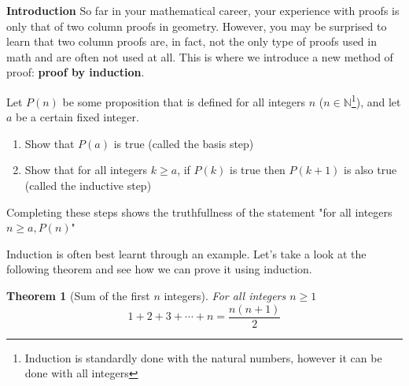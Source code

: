 \documentclass[addpoints]{exam}
\newtheorem{theorem}{Theorem}
\begin{document}
\begin{tcolorbox}[breakable, title=INDUCTION INTRO, colframe=black, sharp corners, colback=white, colbacktitle=white, coltitle=black]
	\Large\textbf{Introduction}
	\newline\normalsize So far in your mathematical career, your experience with proofs is only that of two column proofs in geometry. However, you may be surprised to learn that two column proofs are, in fact, not the only type of proofs used in math and are often not used at all. This is where we introduce a new method of proof: \textbf{proof by induction}.
	\begin{tcolorbox}[breakable, title=INDUCTION STEPS, colframe=black, sharp corners, colback=white, colbacktitle=white, coltitle=black]
		Let $P(n)$ be some proposition that is defined for all integers $n$ ($n \in \mathbb{N}$\footnote{Induction is standardly done with the natural numbers, however it can be done with all integers}), and let $a$ be a certain fixed integer.
		\begin{enumerate}
			\item Show that $P(a)$ is true (called the basis step)
			\item Show that for all integers $k \geq a$, if $P(k)$ is true then $P(k+1)$ is also true (called the inductive step)
		\end{enumerate}
		Completing these steps shows the truthfullness of the statement "for all integers $n \geq a, P(n)$"
	\end{tcolorbox}
\end{tcolorbox}
\vspace{0.2in}
Induction is often best learnt through an example. Let's take a look at the following theorem and see how we can prove it using induction.
\begin{theorem}[Sum of the first $n$ integers]
	For all integers $n \geq 1$
	\[
		1 + 2 + 3 + \cdots + n = \frac{n\left(n+1\right)}{2}
	\]
\end{theorem}
\ifprintanswers
\end{document}
